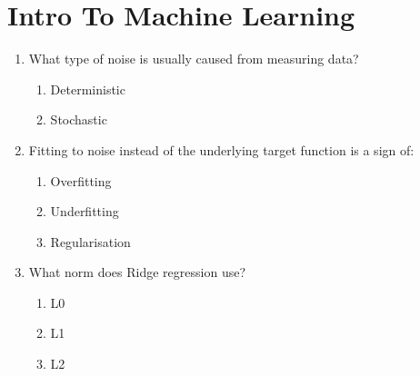 \documentclass{report}
\numberwithin{equation}{section}
\begin{document}
\section{Intro To Machine Learning}
\begin{enumerate}
\item What type of noise is usually caused from measuring data?
\begin{enumerate}[label=\alph*.]
\item Deterministic
\item Stochastic
\end{enumerate}
\item Fitting to noise instead of the underlying target function is a sign of:
\begin{enumerate}[label=\alph*.]
\item Overfitting
\item Underfitting
\item Regularisation
\end{enumerate}
\item What norm does Ridge regression use?
\begin{enumerate}[label=\alph*.]
\item L0
\item L1
\item L2
\end{enumerate}
\end{enumerate}
\end{document}
